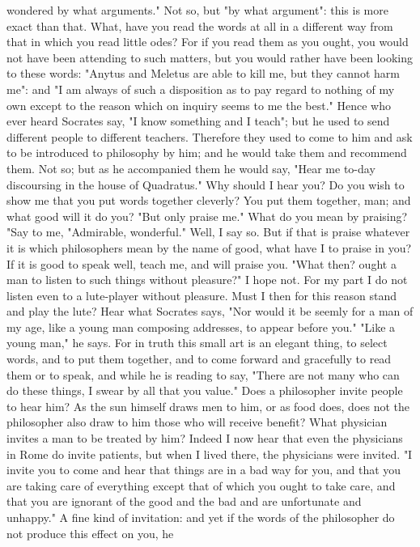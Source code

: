 \documentclass[a4paper]{article}
\begin{document}
wondered by what arguments." Not so, but "by what argument": this is more exact
than that. What, have you read the words at all in a different way from that in
which you read little odes? For if you read them as you ought, you would not
have been attending to such matters, but you would rather have been looking to
these words: "Anytus and Meletus are able to kill me, but they cannot harm me":
and "I am always of such a disposition as to pay regard to nothing of my own
except to the reason which on inquiry seems to me the best." Hence who ever
heard Socrates say, "I know something and I teach"; but he used to send
different people to different teachers. Therefore they used to come to him and
ask to be introduced to philosophy by him; and he would take them and recommend
them. Not so; but as he accompanied them he would say, "Hear me to-day
discoursing in the house of Quadratus." Why should I hear you? Do you wish to
show me that you put words together cleverly? You put them together, man; and
what good will it do you? "But only praise me." What do you mean by praising?
"Say to me, "Admirable, wonderful." Well, I say so. But if that is praise
whatever it is which philosophers mean by the name of good, what have I to
praise in you? If it is good to speak well, teach me, and will praise you.
"What then? ought a man to listen to such things without pleasure?" I hope not.
For my part I do not listen even to a lute-player without pleasure. Must I then
for this reason stand and play the lute? Hear what Socrates says, "Nor would it
be seemly for a man of my age, like a young man composing addresses, to appear
before you." "Like a young man," he says. For in truth this small art is an
elegant thing, to select words, and to put them together, and to come forward
and gracefully to read them or to speak, and while he is reading to say, "There
are not many who can do these things, I swear by all that you value."
    Does a philosopher invite people to hear him? As the sun himself draws men
to him, or as food does, does not the philosopher also draw to him those who
will receive benefit? What physician invites a man to be treated by him? Indeed
I now hear that even the physicians in Rome do invite patients, but when I
lived there, the physicians were invited. "I invite you to come and hear that
things are in a bad way for you, and that you are taking care of everything
except that of which you ought to take care, and that you are ignorant of the
good and the bad and are unfortunate and unhappy." A fine kind of invitation:
and yet if the words of the philosopher do not produce this effect on you, he
\end{document}
